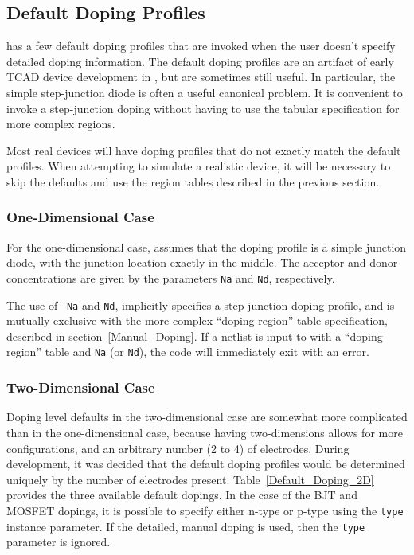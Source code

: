 \newpage
\subsection{Default Doping Profiles}
\Xyce{} has a few default doping profiles that are invoked when the user
doesn't specify detailed doping information.  The default doping 
profiles are an artifact of early TCAD device development in \Xyce{}, but are 
sometimes still useful.  In particular, the simple step-junction diode
is often a useful canonical problem.  It is convenient to invoke a
step-junction doping without having to use the tabular specification
for more complex regions.

Most real devices will have doping profiles that do not exactly match the
default profiles.  When attempting to simulate a realistic device, it
will be necessary to skip the defaults and use the region tables described in
the previous section.

\subsubsection{One-Dimensional Case} \label{one_d_default_dope}
For the one-dimensional case, \Xyce{} assumes that the doping profile is a
simple junction diode, with the junction location exactly in the middle.  The
acceptor and donor concentrations are given by the parameters \texttt{Na} and
\texttt{Nd}, respectively.  

The use of ~\texttt{Na} and \texttt{Nd}, implicitly specifies a step junction
doping profile, and is mutually exclusive with the more complex ``doping
region'' table specification, described in section~\ref{Manual_Doping}.  If a
netlist is input to \Xyce{} with a ``doping region'' table and \texttt{Na} (or
\texttt{Nd}), the code will immediately exit with an error.

\subsubsection{Two-Dimensional Case} \label{two_d_default_dope}
Doping level defaults in the two-dimensional case are somewhat more complicated
than in the one-dimensional case, because having two-dimensions allows for more
configurations, and an arbitrary number (2 to 4) of electrodes.  During \Xyce{}
development, it was decided that the default doping profiles would be
determined uniquely by the number of electrodes present.
Table~\ref{Default_Doping_2D} provides the three available default dopings.  In
the case of the BJT and MOSFET dopings, it is possible to specify either n-type
or p-type using the \texttt{type} instance parameter.   If the detailed, manual
doping is used, then the \texttt{type} parameter is ignored.

